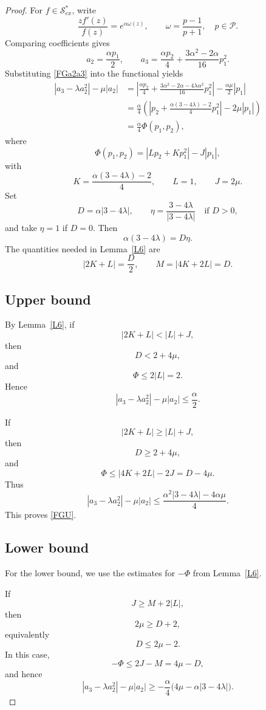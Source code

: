 \documentclass[11pt,reqno]{amsart}
\numberwithin{equation}{section}
\begin{document}
\begin{proof}
For $f\in\mathcal{S}_{ex}^{\ast}$, write
\[
\frac{zf'(z)}{f(z)}
=
e^{\alpha\omega(z)},
\qquad
\omega
=
\frac{p-1}{p+1},
\quad
p\in\mathcal{P}.
\]
Comparing coefficients gives
\begin{equation}\label{FGa2a3}
a_2=\frac{\alpha p_1}{2},
\qquad
a_3
=
\frac{\alpha p_2}{4}
+
\frac{3\alpha^2-2\alpha}{16}p_1^2.
\end{equation}
Substituting \eqref{FGa2a3} into the functional yields
\begin{equation}\label{FGPhi}
\begin{aligned}
|a_3-\lambda a_2^2|-\mu|a_2|
&=
\left|
\frac{\alpha p_2}{4}
+
\frac{3\alpha^2-2\alpha-4\lambda\alpha^2}{16}p_1^2
\right|
-\frac{\alpha\mu}{2}|p_1|\\
&=
\frac{\alpha}{4}
\left(
\left|
p_2+\frac{\alpha(3-4\lambda)-2}{4}p_1^2
\right|
-2\mu|p_1|
\right)\\
&=
\frac{\alpha}{4}\Phi(p_1,p_2),
\end{aligned}
\end{equation}
where
\[
\Phi(p_1,p_2)
=
|Lp_2+Kp_1^2|-J|p_1|,
\]
with
\[
K=\frac{\alpha(3-4\lambda)-2}{4},
\qquad
L=1,
\qquad
J=2\mu.
\]
Set
\[
D=\alpha|3-4\lambda|,
\qquad
\eta=\frac{3-4\lambda}{|3-4\lambda|}
\quad
\text{if }D>0,
\]
and take $\eta=1$ if $D=0$. Then
\[
\alpha(3-4\lambda)=D\eta.
\]
The quantities needed in Lemma~\ref{L6} are
\[
|2K+L|=\frac{D}{2},
\qquad
M=|4K+2L|=D.
\]

\subsection*{Upper bound}
By Lemma~\ref{L6}, if
\[
|2K+L|<|L|+J,
\]
then
\[
D<2+4\mu,
\]
and
\[
\Phi\le 2|L|=2.
\]
Hence
\[
|a_3-\lambda a_2^2|-\mu|a_2|
\le
\frac{\alpha}{2}.
\]

If
\[
|2K+L|\ge |L|+J,
\]
then
\[
D\ge2+4\mu,
\]
and
\[
\Phi\le |4K+2L|-2J=D-4\mu.
\]
Thus
\[
|a_3-\lambda a_2^2|-\mu|a_2|
\le
\frac{\alpha^2|3-4\lambda|-4\alpha\mu}{4}.
\]
This proves \eqref{FGU}.

\subsection*{Lower bound}
For the lower bound, we use the estimates for $-\Phi$ from Lemma~\ref{L6}.

If
\[
J\ge M+2|L|,
\]
then
\[
2\mu\ge D+2,
\]
equivalently
\[
D\le2\mu-2.
\]
In this case,
\[
-\Phi\le 2J-M=4\mu-D,
\]
and hence
\[
|a_3-\lambda a_2^2|-\mu|a_2|
\ge
-\frac{\alpha}{4}\bigl(4\mu-\alpha|3-4\lambda|\bigr).
\]


\end{proof}
\end{document}
